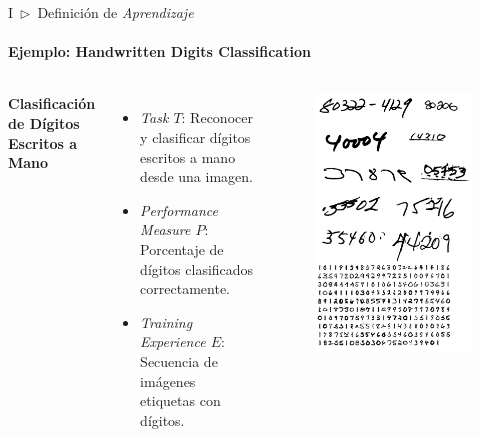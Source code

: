 \documentclass[xcolor=dvipsnames]{beamer}
\begin{document}
    \begin{frame}{I~$\rhd$~Definición de \textit{Aprendizaje}}
    \framesubtitle{Ejemplo: Handwritten Digits Classification}
       \begin{columns}
            \textbf{Clasificación de Dígitos Escritos a Mano}
            \begin{itemize}
                \item \textit{Task \( T \)}: Reconocer y clasificar dígitos escritos a mano desde una imagen.
                \item \textit{Performance Measure \( P \)}: Porcentaje de dígitos clasificados correctamente.
                \item \textit{Training Experience \( E \)}: Secuencia de imágenes etiquetas con dígitos.
            \end{itemize}
            \begin{figure}
                \centering
                \includegraphics[width=\linewidth]{imgs/sec1/0899-7667-img1.png}
            \end{figure}
        \end{columns} 
    \end{frame}
\end{document}
